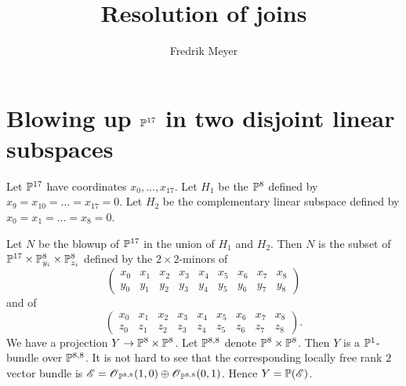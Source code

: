 \documentclass[11pt, english]{article}
\begin{document}
\title{Resolution of joins}
\author{Fredrik Meyer}
\maketitle

\section{Blowing up \texorpdfstring{$\mathbb{P}^{17}$}{P17} in two disjoint linear subspaces}

Let $\mathbb{P}^{17}$ have coordinates $x_0,\ldots,x_{17}$. Let $H_1$ be the $\mathbb{P}^8$ defined by $x_9=x_{10}=\ldots=x_{17}=0$. Let $H_2$ be the complementary linear subspace defined by $x_0=x_1=\ldots=x_8=0$.

Let $N$ be the blowup of $\mathbb{P}^{17}$ in the union of $H_1$ and $H_2$. Then $N$ is the subset of $\mathbb{P}^{17} \times \mathbb{P}^8_{y_i} \times \mathbb{P}^8_{z_i}$ defined by the $2 \times 2$-minors of
\[
\begin{pmatrix}
x_0 & x_1 & x_2 & x_3 & x_4 & x_5 & x_6 & x_7 & x_8 \\
y_0 & y_1 & y_2 & y_3 & y_4 & y_5 & y_6 & y_7 & y_8
\end{pmatrix}
\]
and of 
\[
\begin{pmatrix}
x_0 & x_1 & x_2 & x_3 & x_4 & x_5 & x_6 & x_7 & x_8 \\
z_0 & z_1 & z_2 & z_3 & z_4 & z_5 & z_6 & z_7 & z_8
\end{pmatrix}.
\]
We have a projection $Y \to \mathbb{P}^8 \times \mathbb{P}^8$. Let $\mathbb{P}^{8,8}$ denote $\mathbb{P}^8 \times \mathbb{P}^8$. Then $Y$ is a  $\mathbb{P}^1$-bundle over $\mathbb{P}^{8,8}$. It is not hard to see that the corresponding locally free rank $2$ vector bundle is $\mathscr E = \operatorname{\mathscr{O}}_{\mathbb{P}^{8,8}}(1,0) \oplus \operatorname{\mathscr{O}}_{\mathbb{P}^{8,8}}(0,1)$. Hence $Y = \mathbb{P}(\mathscr E)$. 
\end{document}
